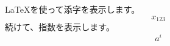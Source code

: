 \documentclass{ltjsarticle}
\begin{document}
\LaTeX を使って添字を表示します。
\[ x_{123} \]
続けて、指数を表示します。
\[ a^i \]
\end{document}
